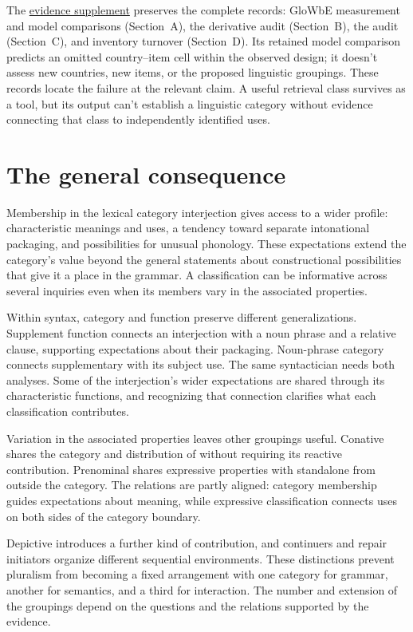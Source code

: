 \documentclass[12pt]{article}
\begin{document}
The \href{inquiry-relative-evidence-supplement.pdf}{evidence supplement}
preserves the complete records: GloWbE measurement and model comparisons
(Section~A), the derivative audit (Section~B), the  audit
(Section~C), and inventory turnover (Section~D). Its retained model
comparison predicts an omitted country--item cell within the observed
design; it doesn't assess new countries, new items, or the proposed
linguistic groupings. These records locate
the failure at the relevant claim. A useful retrieval class survives
as a tool, but its output can't establish a linguistic category
without evidence connecting that class to independently identified uses.

\section{The general consequence}\label{sec:discussion}

Membership in the lexical category interjection gives access to a wider
profile: characteristic meanings and uses, a tendency toward separate
intonational packaging, and possibilities for unusual phonology. These
expectations extend the category's value beyond the general statements
about constructional possibilities that give it a place in the grammar. A classification can be informative across several inquiries
even when its members vary in the associated properties.

Within syntax, category and function preserve different generalizations.
Supplement function connects an interjection with a noun phrase and
a relative clause, supporting expectations about their packaging. Noun-phrase
category connects supplementary  with its subject
use. The same syntactician needs both analyses. Some of the interjection's
wider expectations are shared through its characteristic functions, and
recognizing that connection clarifies what each classification contributes.

Variation in the associated properties leaves other groupings useful.
Conative  shares the category and distribution of 
without requiring its reactive contribution. Prenominal 
shares expressive properties with standalone  from outside
the category. The relations are partly aligned: category membership guides
expectations about meaning, while expressive classification connects uses
on both sides of the category boundary.

Depictive  introduces a further kind of contribution, and continuers
and repair initiators organize different sequential environments. These
distinctions prevent pluralism from becoming a fixed arrangement with
one category for grammar, another for semantics, and a third for interaction.
The number and extension of the groupings depend on the questions
and the relations supported by the evidence.
\end{document}
